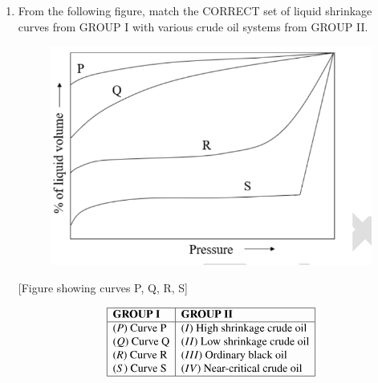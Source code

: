 \documentclass[journal,12pt,onecolumn]{IEEEtran}
\theoremstyle{remark}
\begin{document}
\begin{enumerate}
\item  From the following figure, match the CORRECT set of liquid shrinkage curves from GROUP I with various crude oil systems from GROUP II.
\begin{figure}[h]
    \centering
    \includegraphics[width=0.5\columnwidth]{figs/im 7.jpeg}
    \caption{}
    \label{fig:placeholder}
\end{figure}


\begin{center}
[Figure showing curves P, Q, R, S]
\end{center}

\begin{table}[h!]
\centering
\[
\begin{array}{|l|l|}
\hline
\textbf{GROUP I} & \textbf{GROUP II} \\
\hline
(P)\ \text{Curve P} & (I)\ \text{High shrinkage crude oil} \\
(Q)\ \text{Curve Q} & (II)\ \text{Low shrinkage crude oil} \\
(R)\ \text{Curve R} & (III)\ \text{Ordinary black oil} \\
(S)\ \text{Curve S} & (IV)\ \text{Near-critical crude oil} \\
\hline
\end{array}
\]
\caption{Matching of crude oil types with PVT curves}
\label{tab:curves}
\end{table}


\begin{enumerate}
\end{enumerate}
\hfill{}




\end{enumerate}
\end{document}

